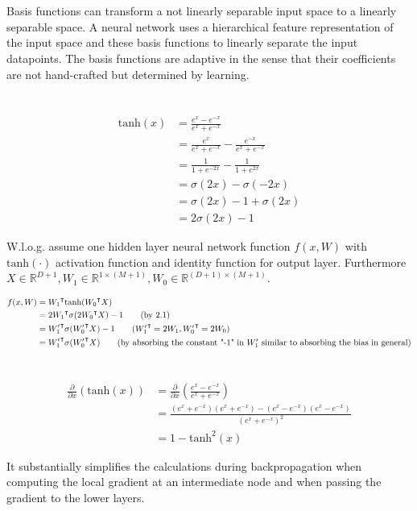 \documentclass[11pt]{article}
\newcommand{\exercise}{\section{}}
\newcommand{\tf}[1]{{#1}^{\intercal}}
\newcommand{\partialf}[1]{\frac{\partial}{{\partial #1}}}
\begin{document}
\exercise

Basis functions can transform a not linearly separable input space to a linearly separable space. A neural network uses a hierarchical feature representation of the input space and these basis functions to linearly separate the input datapoints. The basis functions are adaptive in the sense that their coefficients are not hand-crafted but determined by learning.

\exercise

\begin{align*}
\text{tanh}(x) &= \frac{e^x - e^{-x}}{e^x + e^{-x}} \\
&= \frac{e^x}{e^x + e^{-x}} - \frac{e^{-x}}{e^x + e^{-x}} \\
&= \frac{1}{1 + e^{-2x}} - \frac{1}{1 + e^{2x}} \\
&= \sigma(2x) - \sigma(-2x) \\
&= \sigma(2x) - 1 + \sigma(2x) \\
&= 2\sigma(2x) - 1 \tag{2.1}
\end{align*}

\noindent W.l.o.g. assume one hidden layer neural network function $f(x, W)$ with $\text{tanh}(\cdot)$ activation function and identity function for output layer.
Furthermore $X \in \mathbb{R}^{D+1}, W_1 \in \mathbb{R}^{1 \times {(M+1)}}, W_0 \in \mathbb{R}^{(D+1) \times (M+1)}$.

\begin{align*}
f(x, W) &= \tf{W_1} \text{tanh}(\tf{W_0} X) \\
&= \tf{2W_1} \sigma(\tf{2W_0} X) - 1 \tag{by 2.1} \\
&= \tf{W_1^\prime} \sigma(\tf{W_0^\prime} X) - 1 \tag{$\tf{W_1^\prime} = 2W_1, \tf{W_0^\prime} = 2W_0$} \\
&= \tf{W_1^\prime} \sigma(\tf{W_0^\prime} X) \tag{by absorbing the constant "-1" in $W_1^\prime$ similar to absorbing the bias in general} \\
\end{align*}

\exercise

\begin{align*}
\partialf{x}(\text{tanh}(x)) &= \partialf{x}(\frac{e^x - e^{-x}}{e^x + e^{-x}}) \\
&= \frac{ ( e^x + e^{-x} )( e^x + e^{-x}) - ( e^x - e^{-x} )( e^x - e^{-x} )}{ ( e^x + e^{-x} )^2 } \\
&= 1 - \text{tanh}^2(x)
\end{align*}

\noindent It substantially simplifies the calculations during backpropagation when computing the local gradient at an intermediate node and when passing the gradient to the lower layers.
\end{document}
